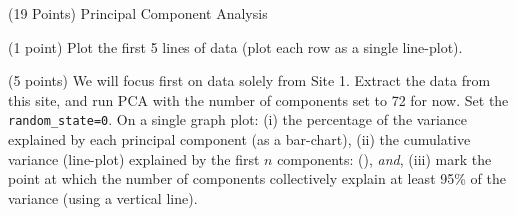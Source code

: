 \documentclass[12pt]{article}
\begin{document}

\begin{question}{(19 Points) Principal Component Analysis}




\begin{subquestion}{(1 point) Plot the first 5 lines of data (plot each row as a single line-plot).}






\end{subquestion}



\begin{subquestion}{(5 points) We will focus first on data solely from Site 1. Extract the data from this site, and run PCA with the number of components set to 72 for now. Set the \texttt{random\_state=0}. On a single graph plot: (i) the percentage of the variance explained by each principal component (as a bar-chart), (ii) the cumulative variance (line-plot) explained by the first $n$ components: (), \textsl{and}, (iii) mark the point at which the number of components collectively explain at least 95\% of the variance (using a vertical line). }




\end{subquestion}
\end{question}
\end{document}
